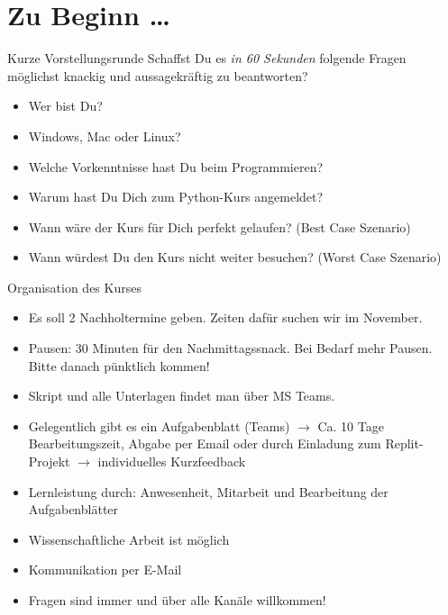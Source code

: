 \section{Zu Beginn \dots}

\begin{frame}
\begin{block}{Kurze Vorstellungsrunde}
	\vspace{2pt}
	Schaffst Du es \emph{in 60 Sekunden} folgende Fragen möglichst knackig und aussagekräftig zu beantworten?
	\begin{itemize}
		\item Wer bist Du? 
		\item Windows, Mac oder Linux?
		\item Welche Vorkenntnisse hast Du beim Programmieren?  
		\item Warum hast Du Dich zum Python-Kurs angemeldet? 
		\item Wann wäre der Kurs für Dich perfekt gelaufen? (Best Case Szenario)
		\item Wann würdest Du den Kurs nicht weiter besuchen? (Worst Case Szenario)
	\end{itemize}
\end{block}
\end{frame}


\begin{frame}
	\begin{block}{Organisation des Kurses}
		\pause 
		\begin{itemize}[<+->]
			\item Es soll 2 Nachholtermine geben. Zeiten dafür suchen wir im November. 
			\item Pausen: 30 Minuten für den Nachmittagssnack. Bei Bedarf mehr Pausen. Bitte danach pünktlich kommen! 
			\item Skript und alle Unterlagen findet man über MS Teams.
			\item Gelegentlich gibt es ein Aufgabenblatt (Teams) $\rightarrow$ Ca. 10 Tage Bearbeitungszeit, Abgabe per Email oder durch Einladung zum Replit-Projekt  $\rightarrow$ individuelles Kurzfeedback
			\item Lernleistung durch: Anwesenheit, Mitarbeit und Bearbeitung der Aufgabenblätter 
			\item Wissenschaftliche Arbeit ist möglich
			\item Kommunikation per E-Mail
			\item Fragen sind immer und über alle Kanäle willkommen!
		\end{itemize}
	\end{block}
\end{frame}


